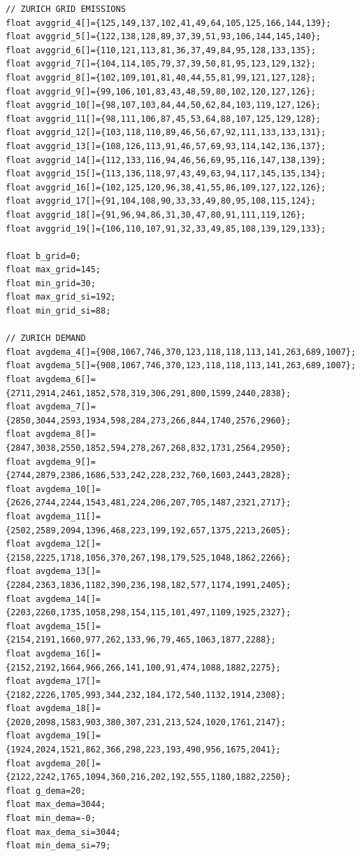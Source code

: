 \documentclass[a4paper,9pt]{article}
\begin{document}
\begin{lstlisting}[basicstyle=\tiny,style=CStyle]
// ZURICH GRID EMISSIONS
float avggrid_4[]={125,149,137,102,41,49,64,105,125,166,144,139};
float avggrid_5[]={122,138,128,89,37,39,51,93,106,144,145,140};
float avggrid_6[]={110,121,113,81,36,37,49,84,95,128,133,135};
float avggrid_7[]={104,114,105,79,37,39,50,81,95,123,129,132};
float avggrid_8[]={102,109,101,81,40,44,55,81,99,121,127,128};
float avggrid_9[]={99,106,101,83,43,48,59,80,102,120,127,126};
float avggrid_10[]={98,107,103,84,44,50,62,84,103,119,127,126};
float avggrid_11[]={98,111,106,87,45,53,64,88,107,125,129,128};
float avggrid_12[]={103,118,110,89,46,56,67,92,111,133,133,131};
float avggrid_13[]={108,126,113,91,46,57,69,93,114,142,136,137};
float avggrid_14[]={112,133,116,94,46,56,69,95,116,147,138,139};
float avggrid_15[]={113,136,118,97,43,49,63,94,117,145,135,134};
float avggrid_16[]={102,125,120,96,38,41,55,86,109,127,122,126};
float avggrid_17[]={91,104,108,90,33,33,49,80,95,108,115,124};
float avggrid_18[]={91,96,94,86,31,30,47,80,91,111,119,126};
float avggrid_19[]={106,110,107,91,32,33,49,85,108,139,129,133};

float b_grid=0;
float max_grid=145;
float min_grid=30;
float max_grid_si=192;
float min_grid_si=88;

// ZURICH DEMAND
float avgdema_4[]={908,1067,746,370,123,118,118,113,141,263,689,1007};
float avgdema_5[]={908,1067,746,370,123,118,118,113,141,263,689,1007};
float avgdema_6[]={2711,2914,2461,1852,578,319,306,291,800,1599,2440,2838};
float avgdema_7[]={2850,3044,2593,1934,598,284,273,266,844,1740,2576,2960};
float avgdema_8[]={2847,3038,2550,1852,594,278,267,268,832,1731,2564,2950};
float avgdema_9[]={2744,2879,2386,1686,533,242,228,232,760,1603,2443,2828};
float avgdema_10[]={2626,2744,2244,1543,481,224,206,207,705,1487,2321,2717};
float avgdema_11[]={2502,2589,2094,1396,468,223,199,192,657,1375,2213,2605};
float avgdema_12[]={2158,2225,1718,1056,370,267,198,179,525,1048,1862,2266};
float avgdema_13[]={2284,2363,1836,1182,390,236,198,182,577,1174,1991,2405};
float avgdema_14[]={2203,2260,1735,1058,298,154,115,101,497,1109,1925,2327};
float avgdema_15[]={2154,2191,1660,977,262,133,96,79,465,1063,1877,2288};
float avgdema_16[]={2152,2192,1664,966,266,141,100,91,474,1088,1882,2275};
float avgdema_17[]={2182,2226,1705,993,344,232,184,172,540,1132,1914,2308};
float avgdema_18[]={2020,2098,1583,903,380,307,231,213,524,1020,1761,2147};
float avgdema_19[]={1924,2024,1521,862,366,298,223,193,490,956,1675,2041};
float avgdema_20[]={2122,2242,1765,1094,360,216,202,192,555,1180,1882,2250};
float g_dema=20;
float max_dema=3044;
float min_dema=-0;
float max_dema_si=3044;
float min_dema_si=79;



\end{lstlisting}
\end{document}
